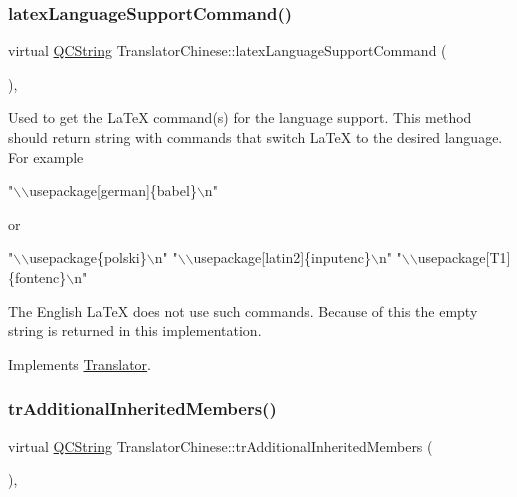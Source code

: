 \subsubsection{\texorpdfstring{latexLanguageSupportCommand()}{latexLanguageSupportCommand()}}
{\footnotesize\ttfamily virtual \mbox{\hyperlink{class_q_c_string}{Q\+C\+String}} Translator\+Chinese\+::latex\+Language\+Support\+Command (\begin{DoxyParamCaption}{ }\end{DoxyParamCaption})\hspace{0.3cm}{\ttfamily [inline]}, {\ttfamily [virtual]}}

Used to get the La\+TeX command(s) for the language support. This method should return string with commands that switch La\+TeX to the desired language. For example 
\begin{DoxyPre}"\(\backslash\)\(\backslash\)usepackage[german]\{babel\}\(\backslash\)n"
\end{DoxyPre}
 or 
\begin{DoxyPre}"\(\backslash\)\(\backslash\)usepackage\{polski\}\(\backslash\)n"
"\(\backslash\)\(\backslash\)usepackage[latin2]\{inputenc\}\(\backslash\)n"
"\(\backslash\)\(\backslash\)usepackage[T1]\{fontenc\}\(\backslash\)n"
\end{DoxyPre}


The English La\+TeX does not use such commands. Because of this the empty string is returned in this implementation. 

Implements \mbox{\hyperlink{class_translator}{Translator}}.

\mbox{\label{class_translator_chinese_a2bfe5184a9fd92092081ef544ea865f5}} 
\subsubsection{\texorpdfstring{trAdditionalInheritedMembers()}{trAdditionalInheritedMembers()}}
{\footnotesize\ttfamily virtual \mbox{\hyperlink{class_q_c_string}{Q\+C\+String}} Translator\+Chinese\+::tr\+Additional\+Inherited\+Members (\begin{DoxyParamCaption}{ }\end{DoxyParamCaption})\hspace{0.3cm}{\ttfamily [inline]}, {\ttfamily [virtual]}}

